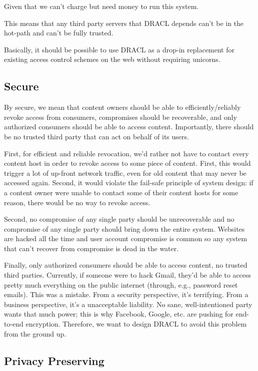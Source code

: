 \documentclass[pdftex,12pt,a4papaer]{report}
\begin{document}
Given that we can't charge but need money to run this system.


This means that any third party servers that DRACL depends can't be in the
hot-path and can't be fully trusted.

Basically, it should be possible to use DRACL as a drop-in replacement for
existing access control schemes on the web without requiring unicorns.

\subsection{Secure}

By secure, we mean that content owners should be able to efficiently/reliably
revoke access from consumers, compromises should be recoverable, and only
authorized consumers should be able to access content. Importantly, there should
be no trusted third party that can act on behalf of its users.

First, for efficient and reliable revocation, we'd rather not have to contact
every content host in order to revoke access to some piece of content. First,
this would trigger a lot of up-front network traffic, even for old content that
may never be accessed again. Second, it would violate the fail-safe principle of
system design: if a content owner were unable to contact some of their content
hosts for some reason, there would be no way to revoke access.

Second, no compromise of any single party should be unrecoverable and no
compromise of any single party should bring down the entire system. Websites are
hacked all the time and user account compromise is common so any system that
can't recover from compromise is dead in the water.

Finally, only authorized consumers should be able to access content, no trusted
third parties. Currently, if someone were to hack Gmail, they'd be able to
access pretty much everything on the public internet (through, e.g., password
reset emails). This was a mistake. From a security perspective, it's terrifying.
From a business perspective, it's a unacceptable liability. No sane,
well-intentioned party wants that much power; this is why Facebook, Google, etc.
are pushing for end-to-end encryption. Therefore, we want to design DRACL to
avoid this problem from the ground up.

\subsection{Privacy Preserving}
\end{document}
